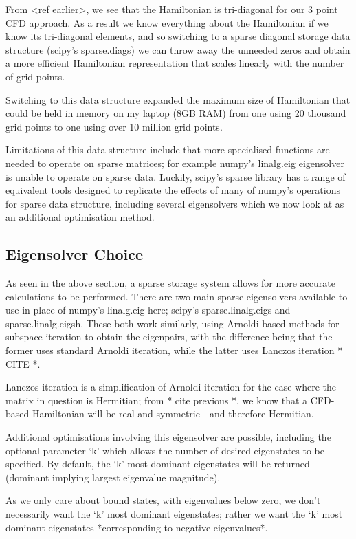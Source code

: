 From <ref earlier>, we see that the Hamiltonian is tri-diagonal for our 3 point CFD approach. As a result we know everything about the Hamiltonian if we know its tri-diagonal elements, and so switching to a sparse diagonal storage data structure (scipy's sparse.diags) we can throw away the unneeded zeros and obtain a more efficient Hamiltonian representation that scales linearly with the number of grid points. 

Switching to this data structure expanded the maximum size of Hamiltonian that could be held in memory on my laptop (8GB RAM) from one using 20 thousand grid points to one using over 10 million grid points.

Limitations of this data structure include that more specialised functions are needed to operate on sparse matrices; for example numpy's linalg.eig eigensolver is unable to operate on sparse data. Luckily, scipy's sparse library has a range of equivalent tools designed to replicate the effects of many of numpy's operations for sparse data structure, including several eigensolvers which we now look at as an additional optimisation method.

\subsection{Eigensolver Choice}
As seen in the above section, a sparse storage system allows for more accurate calculations to be performed. There are two main sparse eigensolvers available to use in place of numpy's linalg.eig here; scipy's sparse.linalg.eigs and sparse.linalg.eigsh. These both work similarly, using Arnoldi-based methods for subspace iteration to obtain the eigenpairs, with the difference being that the former uses standard Arnoldi iteration, while the latter uses Lanczos iteration * CITE *. 

Lanczos iteration is a simplification of Arnoldi iteration for the case where the matrix in question is Hermitian; from * cite previous *, we know that a CFD-based Hamiltonian will be real and symmetric - and therefore Hermitian. 

Additional optimisations involving this eigensolver are possible, including the optional parameter `k' which allows the number of desired eigenstates to be specified. By default, the `k' most dominant eigenstates will be returned (dominant implying largest eigenvalue magnitude). 

As we only care about bound states, with eigenvalues below zero, we don't necessarily want the `k' most dominant eigenstates; rather we want the `k' most dominant eigenstates *corresponding to negative eigenvalues*. 

